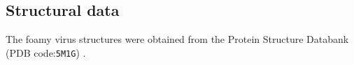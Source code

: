 \documentclass[12pt]{article}
\newcommand{\3}{$3_{10}$}
\begin{document}
\subsection{Structural data}

The foamy virus structures were obtained from the Protein Structure Databank
(PDB code:{\tt 5M1G}) \cite{BallNJet16}.

%
%
\end{document}
